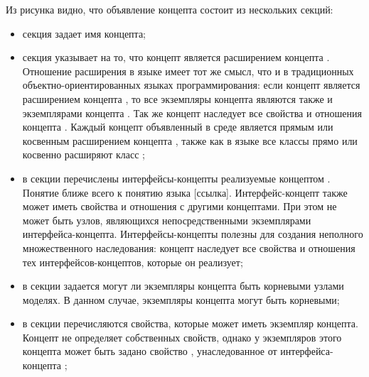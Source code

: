 Из рисунка видно, что объявление концепта состоит из нескольких секций:
\begin{itemize}
 \item секция  задает имя концепта;

 \item секция  указывает на то, что концепт является расширением концепта .
 Отношение расширения в языке  имеет тот же смысл, что и в традиционных объектно-ориентированных
 языках программирования: если концепт  является расширением концепта , то все экземпляры концепта 
 являются также и экземплярами концепта . Так же концепт  наследует все свойства и отношения концепта
 .  Каждый концепт объявленный в среде \MPS{} является прямым или косвенным расширением концепта
 ,  также как в языке  все классы прямо или косвенно расширяют класс ;

 \item в секции  перечислены интерфейсы-концепты реализуемые
 концептом . Понятие  ближе всего к понятию  языка  [ссылка].
 Интерфейс-концепт также может иметь свойства и отношения с другими концептами. При этом не может быть узлов,
 являющихся непосредственными экземплярами интерфейса-концепта. Интерфейсы-концепты полезны для создания неполного
 множественного наследования: концепт наследует все свойства и отношения тех интерфейсов-концептов, которые он
 реализует;

 \item в секции  задается могут ли экземпляры концепта быть корневыми узлами моделях. В
 данном случае, экземпляры концепта  могут быть корневыми;

 \item в секции  перечисляются свойства, которые может иметь экземпляр концепта. Концепт  не определяет собственных свойств, однако у экземпляров этого концепта может быть задано свойство , унаследованное от интерфейса-концепта ;


\end{itemize}
